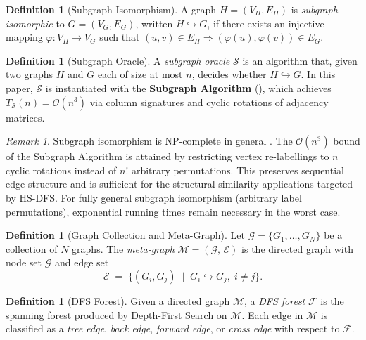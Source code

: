 ﻿\documentclass[12pt,a4paper]{article}
\theoremstyle{plain}
\theoremstyle{definition}
\newtheorem{definition}[theorem]{Definition}
\theoremstyle{remark}
\newtheorem{remark}[theorem]{Remark}
\begin{document}
	\begin{definition}[Subgraph-Isomorphism]
		A graph $H = (V_H, E_H)$ is \emph{subgraph-isomorphic} to $G = (V_G, E_G)$,
		written $H \hookrightarrow G$, if there exists an injective mapping
		$\varphi: V_H \to V_G$ such that
		$(u,v) \in E_H \Rightarrow (\varphi(u), \varphi(v)) \in E_G$.
	\end{definition}
	
	\begin{definition}[Subgraph Oracle]
		\label{def:oracle}
		A \emph{subgraph oracle} $\mathcal{S}$ is an algorithm that, given two
		graphs $H$ and $G$ each of size at most $n$, decides whether
		$H \hookrightarrow G$.  In this paper, $\mathcal{S}$ is instantiated
		with the \textbf{Subgraph Algorithm} (), which
		achieves $T_{\mathcal{S}}(n) = \mathcal{O}(n^3)$ via column signatures
		and cyclic rotations of adjacency matrices.
	\end{definition}
	
	\begin{remark}
		Subgraph isomorphism is NP-complete in general \cite{cook1971}.  The
		$\mathcal{O}(n^3)$ bound of the Subgraph Algorithm is attained by
		restricting vertex re-labellings to $n$ cyclic rotations instead of
		$n!$ arbitrary permutations.  This preserves sequential edge structure
		and is sufficient for the structural-similarity applications targeted
		by HS-DFS.  For fully general subgraph isomorphism (arbitrary label
		permutations), exponential running times remain necessary in the worst
		case.
	\end{remark}
	
	\begin{definition}[Graph Collection and Meta-Graph]
		Let $\mathcal{G} = \{G_1, \ldots, G_N\}$ be a collection of $N$ graphs.
		The \emph{meta-graph} $\mathcal{M} = (\mathcal{G},\, \mathcal{E})$ is the
		directed graph with node set $\mathcal{G}$ and edge set
		\[
		\mathcal{E} \;=\; \bigl\{(G_i, G_j) \;\mid\; G_i \hookrightarrow G_j,\;
		i \neq j\bigr\}.
		\]
	\end{definition}
	
	\begin{definition}[DFS Forest]
		Given a directed graph $\mathcal{M}$, a \emph{DFS forest} $\mathcal{F}$ is
		the spanning forest produced by Depth-First Search on $\mathcal{M}$.  Each
		edge in $\mathcal{M}$ is classified as a
		\emph{tree edge}, \emph{back edge}, \emph{forward edge}, or
		\emph{cross edge} with respect to $\mathcal{F}$.
	\end{definition}
	
\end{document}
